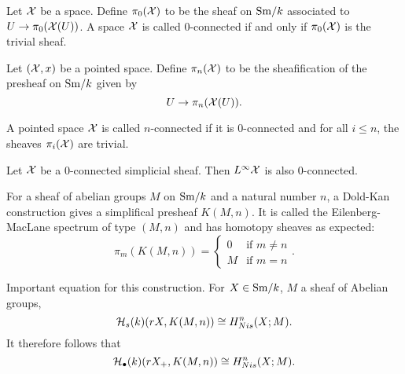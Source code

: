 \documentclass{amsart}%
\begin{document}


\begin{definition}
  Let $\mathcal{X}$ be a space. Define $\pi_0(\mathcal{X})$ to be the
  sheaf on $\mathrm{Sm}/k$ associated to $U \to \pi_0(\mathcal{X}(U))$. A space
  $\mathcal{X}$ is called $0$-connected if and only if
  $\pi_0(\mathcal{X})$ is the trivial sheaf. 

  Let $(\mathcal{X},x)$ be a pointed space. Define
  $\pi_n(\mathcal{X})$ to be the sheafification of the presheaf
  on $\mathrm{Sm}/k$ given by
  \begin{equation*}
    U \to \pi_n(\mathcal{X}(U)).
  \end{equation*}

  A pointed space $\mathcal{X}$ is called $n$-connected if it is
  $0$-connected and for all $i\leq n$, the sheaves
  $\pi_i(\mathcal{X})$ are trivial.
\end{definition}

\begin{proposition}
  Let $\mathcal{X}$ be a $0$-connected simplicial sheaf. Then
  $L^{\infty}\mathcal{X}$ is also $0$-connected.
\end{proposition}

For a sheaf of abelian groups $M$ on $\mathrm{Sm}/k$ and a natural number $n$,
a Dold-Kan construction gives a simplifical presheaf $K(M,n)$. It is
called the Eilenberg-MacLane spectrum of type $(M,n)$ and has homotopy
sheaves as expected:
\begin{equation*}
  \pi_m(K(M,n)) = \begin{cases}0 & \text{if }m\neq n \\ M & \text{if } m = n \end{cases}.
\end{equation*}

Important equation for this construction. For $X\in\mathrm{Sm}/k$, $M$ a sheaf
of Abelian groups,
\begin{equation*}
  \mathcal{H}_s(k)(rX, K(M,n)) \cong H^n_{Nis}(X; M).
\end{equation*}
It therefore follows that
\begin{equation*}
  \mathcal{H}_{\bullet}(k)(rX_+, K(M,n)) \cong H^n_{Nis}(X; M).
\end{equation*}
\end{document}
